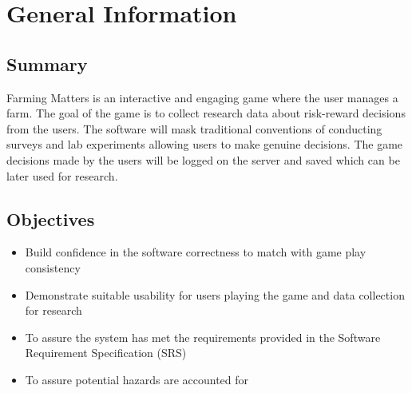 \documentclass[12pt, titlepage]{article}
\begin{document}
\section{General Information}

\subsection{Summary}
Farming Matters is an interactive and engaging game where the user manages a farm. The goal of the game is to collect research data about risk-reward decisions from the users. The software will mask traditional conventions of conducting surveys and
lab experiments allowing users to make genuine decisions. The game decisions made by the users will be logged on the server and saved which can be later used for research.

\subsection{Objectives}

\begin{itemize}
    \item Build confidence in the software correctness to match with game play consistency 
    \item Demonstrate suitable usability for users playing the game and data collection for research
    \item To assure the system has met the requirements provided in the Software Requirement Specification (SRS)
    \item To assure potential hazards are accounted for
\end{itemize}  
\end{document}
